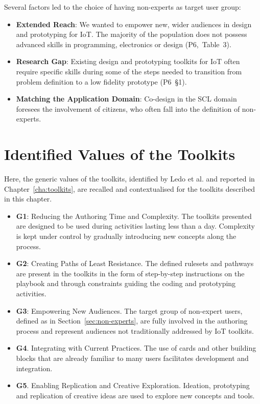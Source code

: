 Several factors led to the choice of having non-experts as target user group:

\begin{itemize}
    \item \textbf{Extended Reach}: We wanted to empower new, wider audiences in design and prototyping for IoT. The majority of the population does not possess advanced skills in programming, electronics or design (P6,~Table~3).
    \item \textbf{Research Gap}: Existing design and prototyping toolkits for IoT often require specific skills during some of the steps needed to transition from problem definition to a low fidelity prototype (P6~\S1).
    \item \textbf{Matching the Application Domain}: Co-design in the SCL domain foresees the involvement of citizens, who often fall into the definition of non-experts.
\end{itemize}


\section{Identified Values of the Toolkits}

Here, the generic values of the toolkits, identified by Ledo et al. \autocite*{ledo_evaluation_2018} and reported in Chapter~\ref{cha:toolkits}, are recalled and contextualised for the toolkits described in this chapter.

\begin{itemize}
    \item \textbf{G1}: Reducing the Authoring Time and Complexity. The toolkits presented are designed to be used during activities lasting less than a day. Complexity is kept under control by gradually introducing new concepts along the process.
    \item \textbf{G2}: Creating Paths of Least Resistance. The defined rulesets and pathways are present in the toolkits in the form of step-by-step instructions on the playbook and through constraints guiding the coding and prototyping activities.
    \item \textbf{G3}: Empowering New Audiences. The target group of non-expert users, defined as in Section~\ref{sec:non-experts}, are fully involved in the authoring process and represent audiences not traditionally addressed by IoT toolkits.
    \item \textbf{G4}. Integrating with Current Practices. The use of cards and other building blocks that are already familiar to many users facilitates development and integration.
    \item \textbf{G5}. Enabling Replication and Creative Exploration. Ideation, prototyping and replication of creative ideas are used to explore new concepts and tools.
\end{itemize}


